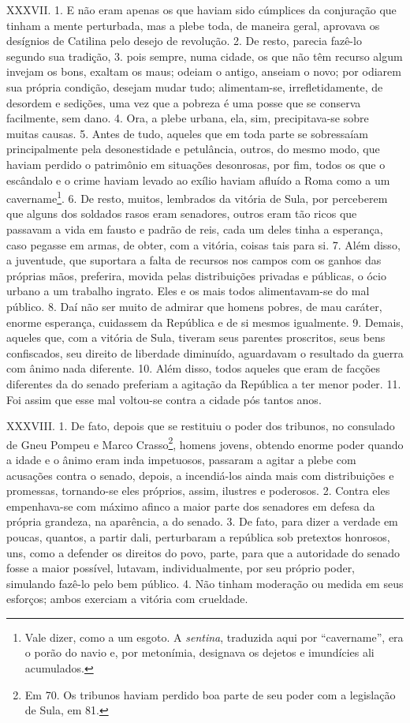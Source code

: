 XXXVII. 1. E não eram apenas os que haviam sido cúmplices da conjuração que
tinham a mente perturbada, mas a plebe toda, de maneira geral, aprovava os
desígnios de Catilina pelo desejo de revolução. 2. De resto, parecia fazê-lo
segundo sua tradição, 3. pois sempre, numa cidade, os que não têm recurso algum
invejam os bons, exaltam os maus; odeiam o antigo, anseiam o novo; por
odiarem sua própria condição, desejam mudar tudo; alimentam-se, irrefletidamente,
de desordem e sedições, uma vez que a pobreza é uma posse que se conserva
facilmente, sem dano. 4. Ora, a plebe urbana, ela, sim, precipitava-se sobre
muitas causas. 5. Antes de tudo, aqueles que em toda parte se sobressaíam
principalmente pela desonestidade e petulância, outros, do mesmo modo, que
haviam perdido o patrimônio em situações desonrosas, por fim, todos os que o
escândalo e o crime haviam levado ao exílio haviam afluído a Roma como a um
cavername\footnote{Vale dizer, como a um esgoto. A \emph{sentina}, traduzida
aqui por ``cavername'', era o porão do navio e, por metonímia, designava os
dejetos e imundícies ali acumulados.}. 6. De resto, muitos, lembrados da
vitória de Sula, por perceberem que alguns dos soldados rasos eram senadores,
outros eram tão ricos que passavam a vida em fausto e padrão de reis, cada um
deles tinha a esperança, caso pegasse em armas, de obter, com a vitória, coisas
tais para si. 7. Além disso, a juventude, que suportara a falta de recursos nos
campos com os ganhos das próprias mãos, preferira, movida pelas distribuições
privadas e públicas, o ócio urbano a um trabalho ingrato. Eles e os mais todos
alimentavam-se do mal público. 8. Daí não ser muito de admirar que homens
pobres, de mau caráter, enorme esperança, cuidassem da República e de si mesmos
igualmente. 9. Demais, aqueles que, com a vitória de Sula, tiveram seus
parentes proscritos, seus bens confiscados, seu direito de liberdade diminuído,
aguardavam o resultado da guerra com ânimo nada diferente. 10. Além disso,
todos aqueles que eram de facções diferentes da do senado preferiam a agitação
da República a ter menor poder. 11. Foi assim que esse mal voltou-se contra a
cidade pós tantos anos.

XXXVIII. 1. De fato, depois que se restituiu o poder dos tribunos, no consulado
de Gneu Pompeu e Marco Crasso\footnote{Em 70. Os tribunos haviam perdido boa
parte de seu poder com a legislação de Sula, em 81.}, homens jovens, obtendo
enorme poder quando a idade e o ânimo eram inda impetuosos, passaram a agitar a
plebe com acusações contra o senado, depois, a incendiá-los ainda mais com
distribuições e promessas, tornando-se eles próprios, assim, ilustres e
poderosos. 2. Contra eles empenhava-se com máximo afinco a maior parte dos
senadores em defesa da própria grandeza, na aparência, a do senado. 3. De fato,
para dizer a verdade em poucas, quantos, a partir dali, perturbaram a república
sob pretextos honrosos, uns, como a defender os direitos do povo, parte, para
que a autoridade do senado fosse a maior possível, lutavam, individualmente, por seu
próprio poder, simulando fazê-lo pelo bem público. 4. Não tinham moderação ou medida em
seus esforços; ambos exerciam a vitória com crueldade. 

